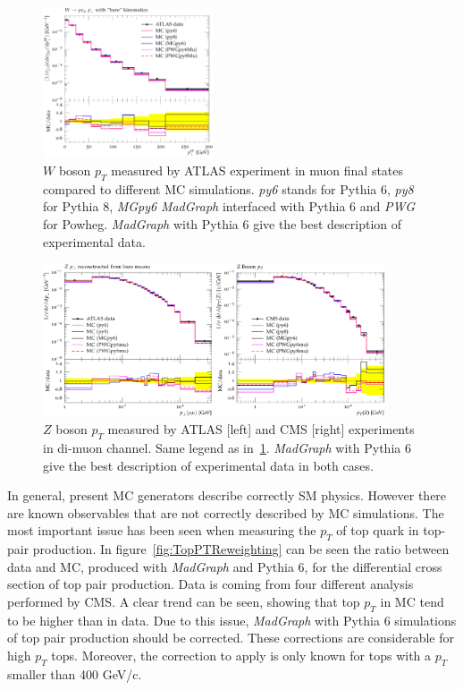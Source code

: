\begin{figure}[!Hhtbp]
  \begin{center}
    \includegraphics[width=0.45\textwidth]{figs/Wpt_rivet.png}
    \caption{$W$ boson $p_{T}$ measured by ATLAS experiment in muon final states compared to different MC simulations. \textit{py6} stands for Pythia 6, \textit{py8} for Pythia 8, \textit{MGpy6} \textit{MadGraph} interfaced with Pythia 6 and \textit{PWG} for Powheg. \textit{MadGraph} with Pythia 6 give the best description of experimental data.}
    \label{fig:WVal}
  \end{center}
\end{figure}

\begin{figure}[!Hhtbp]
  \begin{center}
    \includegraphics[width=0.9\textwidth]{figs/Zpt_rivet.png}
    \caption{$Z$ boson $p_{T}$ measured by ATLAS [left] and CMS [right] experiments in di-muon channel. Same legend as in~\ref{fig:WVal}. \textit{MadGraph} with Pythia 6 give the best description of experimental data in both cases.}
    \label{fig:ZVal}
  \end{center}
\end{figure}

In general, present MC generators describe correctly SM physics. However there are known observables that are not correctly described by MC simulations. The most important issue has been seen when measuring the $p_{T}$ of top quark in top-pair production. In figure~\ref{fig:TopPTReweighting} can be seen the ratio between data and MC, produced with \textit{MadGraph} and Pythia 6, for the differential cross section of top pair production. Data is coming from four different analysis performed by CMS. A clear trend can be seen, showing that top $p_{T}$ in MC tend to be higher than in data. Due to this issue, \textit{MadGraph} with Pythia 6 simulations of top pair production should be corrected. These corrections are considerable for high $p_{T}$ tops. Moreover, the correction to apply is only known for tops with a $p_{T}$ smaller than 400 GeV/c.

